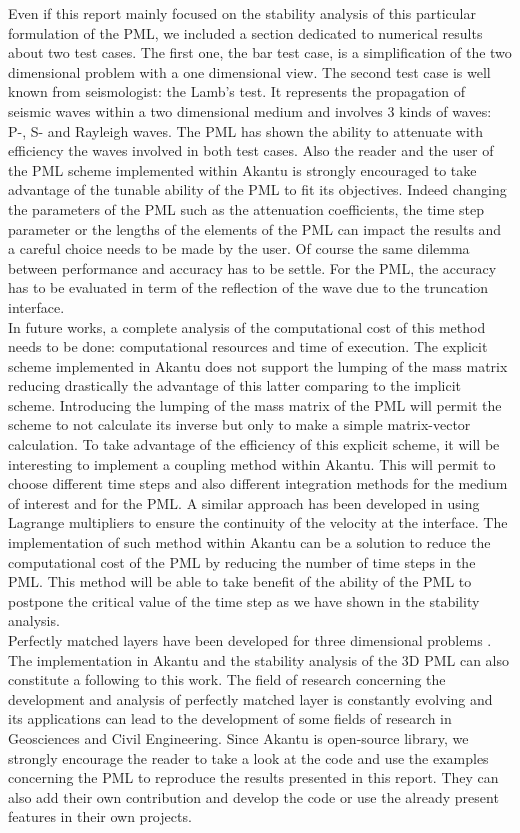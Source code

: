Even if this report mainly focused on the stability analysis of this particular formulation of the PML, we included a section dedicated to numerical results about two test cases. The first one, the bar test case, is a simplification of the two dimensional problem with a one dimensional view. The second test case is well known from seismologist: the Lamb's test. It represents the propagation of seismic waves within a two dimensional medium and involves $3$ kinds of waves: P-, S- and Rayleigh waves. The PML has shown the ability to attenuate with efficiency the waves involved in both test cases. Also the reader and the user of the PML scheme implemented within Akantu is strongly encouraged to take advantage of the tunable ability of the PML to fit its objectives. Indeed changing the parameters of the PML such as the attenuation coefficients, the time step parameter or the lengths of the elements of the PML can impact the results and a careful choice needs to be made by the user. Of course the same dilemma between performance and accuracy has to be settle. For the PML, the accuracy has to be evaluated in term of the reflection of the wave due to the truncation interface.\\     
In future works, a complete analysis of the computational cost of this method needs to be done: computational resources and time of execution. The explicit scheme implemented in Akantu does not support the lumping of the mass matrix reducing drastically the advantage of this latter comparing to the implicit scheme. Introducing the lumping of the mass matrix of the PML will permit the scheme to not calculate its inverse but only to make a simple matrix-vector calculation. To take advantage of the efficiency of this explicit scheme, it will be interesting to implement a coupling method within Akantu. This will permit to choose different time steps and also different integration methods for the medium of interest and for the PML. A similar approach has been developed in \cite{Brun2016} using Lagrange multipliers to ensure the continuity of the velocity at the interface. The implementation of such method within Akantu can be a solution to reduce the computational cost of the PML by reducing the number of time steps in the PML. This method will be able to take benefit of the ability of the PML to postpone the critical value of the time step as we have shown in the stability analysis. \\
Perfectly matched layers have been developed for three dimensional problems \cite{Basu2008}. The implementation in Akantu and the stability analysis of the 3D PML can also constitute a following to this work. The field of research concerning the development and analysis of perfectly matched layer is constantly evolving and its applications can lead to the development of some fields of research in Geosciences and Civil Engineering. Since Akantu is open-source library, we strongly encourage the reader to take a look at the code and use the examples concerning the PML to reproduce the results presented in this report. They can also add their own contribution and develop the code or use the already present features in their own projects.       




